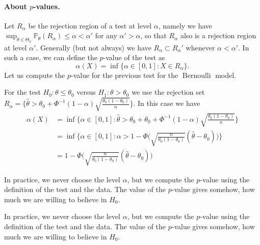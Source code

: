 \documentclass[
	fontsize=11pt, %
	twoside=false, %
	numbers=noenddot, %
]{kaobook}
\DeclareMathOperator{\ber}{Bernoulli}
\renewcommand{\P}{\mathbb P}
\newcommand{\wh}{\widehat}
\begin{document}
\paragraph{About $p$-values.} %

Let $R_\alpha$ be the rejection region of a test at level $\alpha$, namely we have $\sup_{\theta \in \Theta_0} \P_\theta(R_\alpha) \leq \alpha < \alpha'$ for any $\alpha' > \alpha$, so that $R_\alpha$ also is a rejection region at level $\alpha'$.
Generally (but not always) we have $R_\alpha \subset R_\alpha'$ whenever $\alpha < \alpha'$.
In such a case, we can define the $p$-value of the test as
\begin{equation*}
	\alpha(X) = \inf \{ \alpha \in [0, 1] : X \in R_\alpha \}.
\end{equation*}
Let us compute the $p$-value for the previous test for the $\ber$ model.
\begin{example}
	For the test $H_0 : \theta \leq \theta_0$ versus $H_1 : \theta > \theta_0$ we use the rejection set $R_\alpha = \{ \wh \theta > \theta_0 + \Phi^{-1}(1 - \alpha) \sqrt{\frac{\theta_0 (1 - \theta_0)}{n}} \}$.
	In this case we have
	\begin{align*}
		\alpha(X) &= \inf \{ \alpha \in [0, 1] : \wh \theta > \theta_0 + \theta_0 + \Phi^{-1}(1 - \alpha) \sqrt{\frac{\theta_0 (1 - \theta_0)}{n}}  \} \\
		&= \inf \{ \alpha \in [0, 1] : \alpha > 1 - \Phi\Big(  \sqrt{\frac{n}{\theta_0 (1 - \theta_0)}} (\wh \theta - \theta_0) \Big)  \} \\
		&= 1 - \Phi\Big(  \sqrt{\frac{n}{\theta_0 (1 - \theta_0)}} (\wh \theta - \theta_0) \Big)
	\end{align*}
\end{example}


\begin{recipe}
	In practice, we never choose the level $\alpha$, but we compute the $p$-value using the definition of the test and the data. The value of the $p$-value gives somehow, how much we are willing to believe in $H_0$.
\end{recipe}


\begin{warning}
	In practice, we never choose the level $\alpha$, but we compute the $p$-value using the definition of the test and the data. The value of the $p$-value gives somehow, how much we are willing to believe in $H_0$.
\end{warning}


\end{document}
